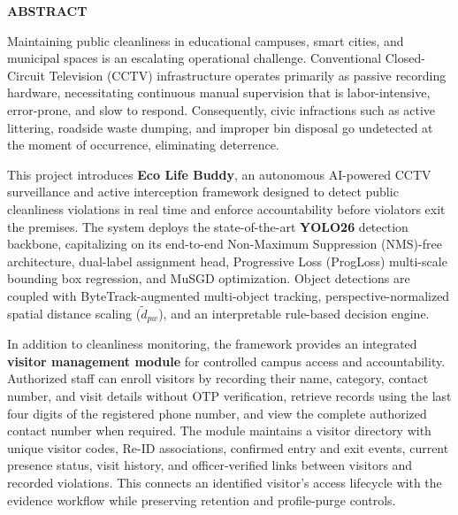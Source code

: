 \documentclass[12pt,a4paper]{report}
\begin{document}
\newpage
\begin{center}
{\Large \textbf{ABSTRACT}}\par
\end{center}
\vspace{0.5cm}

Maintaining public cleanliness in educational campuses, smart cities, and municipal spaces is an escalating operational challenge. Conventional Closed-Circuit Television (CCTV) infrastructure operates primarily as passive recording hardware, necessitating continuous manual supervision that is labor-intensive, error-prone, and slow to respond. Consequently, civic infractions such as active littering, roadside waste dumping, and improper bin disposal go undetected at the moment of occurrence, eliminating deterrence.

This project introduces \textbf{Eco Life Buddy}, an autonomous AI-powered CCTV surveillance and active interception framework designed to detect public cleanliness violations in real time and enforce accountability before violators exit the premises. The system deploys the state-of-the-art \textbf{YOLO26} detection backbone, capitalizing on its end-to-end Non-Maximum Suppression (NMS)-free architecture, dual-label assignment head, Progressive Loss (ProgLoss) multi-scale bounding box regression, and MuSGD optimization. Object detections are coupled with ByteTrack-augmented multi-object tracking, perspective-normalized spatial distance scaling ($\tilde{d}_{pw}$), and an interpretable rule-based decision engine.

In addition to cleanliness monitoring, the framework provides an integrated \textbf{visitor management module} for controlled campus access and accountability. Authorized staff can enroll visitors by recording their name, category, contact number, and visit details without OTP verification, retrieve records using the last four digits of the registered phone number, and view the complete authorized contact number when required. The module maintains a visitor directory with unique visitor codes, Re-ID associations, confirmed entry and exit events, current presence status, visit history, and officer-verified links between visitors and recorded violations. This connects an identified visitor's access lifecycle with the evidence workflow while preserving retention and profile-purge controls.
\end{document}

